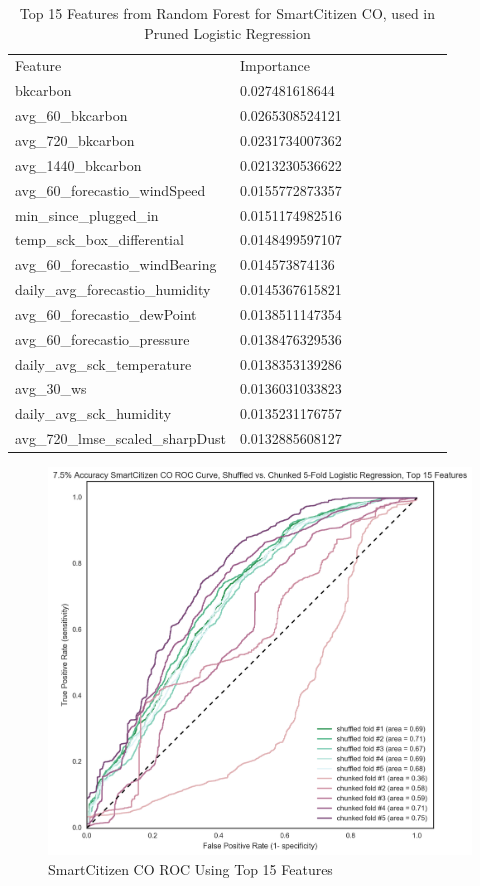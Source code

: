 \begin{table}[H]
\centering
\begin{tabular}{lllllllll}
\\
\\
\toprule
Feature & Importance \\
\midrule
bkcarbon &  0.027481618644 \\
avg\_60\_bkcarbon &  0.0265308524121 \\
avg\_720\_bkcarbon &  0.0231734007362 \\
avg\_1440\_bkcarbon &  0.0213230536622 \\
avg\_60\_forecastio\_windSpeed &  0.0155772873357 \\
min\_since\_plugged\_in &  0.0151174982516 \\
temp\_sck\_box\_differential &  0.0148499597107 \\
avg\_60\_forecastio\_windBearing &  0.014573874136 \\
daily\_avg\_forecastio\_humidity &  0.0145367615821 \\
avg\_60\_forecastio\_dewPoint &  0.0138511147354 \\
avg\_60\_forecastio\_pressure &  0.0138476329536 \\
daily\_avg\_sck\_temperature &  0.0138353139286 \\
avg\_30\_ws &  0.0136031033823 \\
daily\_avg\_sck\_humidity &  0.0135231176757 \\
avg\_720\_lmse\_scaled\_sharpDust &  0.0132885608127 \\
\bottomrule
\end{tabular}
\label{tab:as1_co_randomforest_features}
\caption{Top 15 Features from Random Forest for SmartCitizen CO, used in Pruned Logistic Regression}
\end{table}

\begin{figure}[htb]
 	\includegraphics[width=\textwidth]{figs/sck_co_7p5_roc_pruned_features}               
 	 \caption{SmartCitizen CO ROC Using Top 15 Features}
  	\label{fig:sck_co_7p5_roc_pruned_features}
\end{figure}

